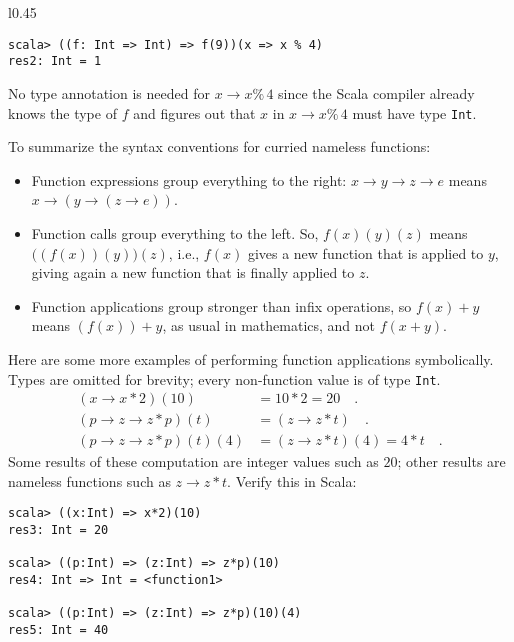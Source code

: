 \begin{wrapfigure}{l}{0.45\columnwidth}%
\vspace{-0.75\baselineskip}
\begin{lstlisting}
scala> ((f: Int => Int) => f(9))(x => x % 4)
res2: Int = 1
\end{lstlisting}
\vspace{-0.75\baselineskip}
\end{wrapfigure}%

\noindent No type annotation is needed for $x\rightarrow x\%\,4$
since the Scala compiler already knows the type of $f$ and figures
out that $x$ in $x\rightarrow x\%\,4$ must have type \lstinline!Int!.

To summarize the syntax conventions for curried nameless functions:
\begin{itemize}
\item Function expressions group everything to the right: $x\rightarrow y\rightarrow z\rightarrow e$
means $x\rightarrow\left(y\rightarrow\left(z\rightarrow e\right)\right)$.
\item Function calls group everything to the left. So, $f(x)(y)(z)$ means
$\big((f(x))(y)\big)(z)$, i.e., $f(x)$ gives a new function that
is applied to $y$, giving again a new function that is finally applied
to $z$.
\item Function applications group stronger than infix operations, so $f(x)+y$
means $(f(x))+y$, as usual in mathematics, and not $f(x+y)$.
\end{itemize}
Here are some more examples of performing function applications symbolically.
Types are omitted for brevity; every non-function value is of type
\texttt{}\lstinline!Int!.
\begin{align*}
\left(x\rightarrow x*2\right)(10) & =10*2=20\quad.\\
\left(p\rightarrow z\rightarrow z*p\right)\left(t\right) & =(z\rightarrow z*t)\quad.\\
\left(p\rightarrow z\rightarrow z*p\right)(t)(4) & =(z\rightarrow z*t)(4)=4*t\quad.
\end{align*}
Some results of these computation are integer values such as $20$;
other results are nameless functions such as $z\rightarrow z*t$.
Verify this in Scala:
\begin{lstlisting}
scala> ((x:Int) => x*2)(10)
res3: Int = 20

scala> ((p:Int) => (z:Int) => z*p)(10)
res4: Int => Int = <function1>

scala> ((p:Int) => (z:Int) => z*p)(10)(4)
res5: Int = 40 
\end{lstlisting}

